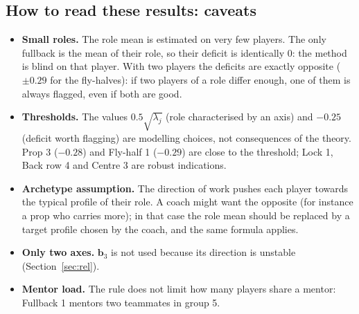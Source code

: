 \documentclass[11pt,a4paper]{article}
\theoremstyle{remark}
\newcommand{\bb}{\mathbf{b}}
\begin{document}
\subsection{How to read these results: caveats}
\begin{itemize}
\item \textbf{Small roles.} The role mean is estimated on very few players. The only fullback is the mean of
their role, so their deficit is identically $0$: the method is blind on that player. With two players the deficits are
exactly opposite ($\pm0.29$ for the fly-halves): if two players of a role differ enough, one of them is always flagged,
even if both are good.
\item \textbf{Thresholds.} The values $0.5\sqrt{\lambda_j}$ (role characterised by an axis) and $-0.25$ (deficit worth
flagging) are modelling choices, not consequences of the theory. Prop 3 ($-0.28$) and Fly-half 1 ($-0.29$) are close
to the threshold; Lock 1, Back row 4 and Centre 3 are robust indications.
\item \textbf{Archetype assumption.} The direction of work pushes each player towards the typical profile of their role.
A coach might want the opposite (for instance a prop who carries more); in that case the role mean should be replaced
by a target profile chosen by the coach, and the same formula applies.
\item \textbf{Only two axes.} $\bb_3$ is not used because its direction is unstable (Section~\ref{sec:rel}).
\item \textbf{Mentor load.} The rule does not limit how many players share a mentor: Fullback 1 mentors two
teammates in group 5.
\end{itemize}
\end{document}

